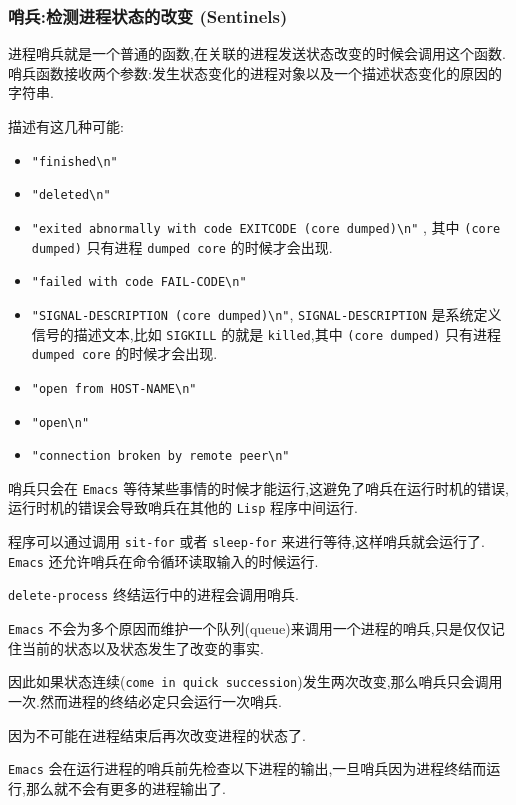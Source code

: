 \documentclass[11pt]{article}
\begin{document}
\subsubsection{哨兵:检测进程状态的改变 (Sentinels)}
\label{sec:org89d46ef}

进程哨兵就是一个普通的函数,在关联的进程发送状态改变的时候会调用这个函数.哨兵函数接收两个参数:发生状态变化的进程对象以及一个描述状态变化的原因的字符串.

描述有这几种可能:

\begin{itemize}
\item \texttt{"finished\textbackslash{}n"}
\item \texttt{"deleted\textbackslash{}n"}
\item \texttt{"exited abnormally with code EXITCODE (core dumped)\textbackslash{}n"} , 其中 \texttt{(core dumped)} 只有进程 \texttt{dumped core} 的时候才会出现.
\item \texttt{"failed with code FAIL-CODE\textbackslash{}n"}
\item \texttt{"SIGNAL-DESCRIPTION (core dumped)\textbackslash{}n"}, \texttt{SIGNAL-DESCRIPTION} 是系统定义信号的描述文本,比如 \texttt{SIGKILL} 的就是 \texttt{killed},其中 \texttt{(core dumped)} 只有进程 \texttt{dumped core} 的时候才会出现.
\item \texttt{"open from HOST-NAME\textbackslash{}n"}
\item \texttt{"open\textbackslash{}n"}
\item \texttt{"connection broken by remote peer\textbackslash{}n"}
\end{itemize}

哨兵只会在 \texttt{Emacs} 等待某些事情的时候才能运行,这避免了哨兵在运行时机的错误,运行时机的错误会导致哨兵在其他的 \texttt{Lisp} 程序中间运行.

程序可以通过调用 \texttt{sit-for} 或者 \texttt{sleep-for} 来进行等待,这样哨兵就会运行了. \texttt{Emacs} 还允许哨兵在命令循环读取输入的时候运行.

\texttt{delete-process} 终结运行中的进程会调用哨兵.

\texttt{Emacs} 不会为多个原因而维护一个队列(queue)来调用一个进程的哨兵,只是仅仅记住当前的状态以及状态发生了改变的事实.

因此如果状态连续(\texttt{come in quick succession})发生两次改变,那么哨兵只会调用一次.然而进程的终结必定只会运行一次哨兵.

因为不可能在进程结束后再次改变进程的状态了.

\texttt{Emacs} 会在运行进程的哨兵前先检查以下进程的输出,一旦哨兵因为进程终结而运行,那么就不会有更多的进程输出了.
\end{document}
